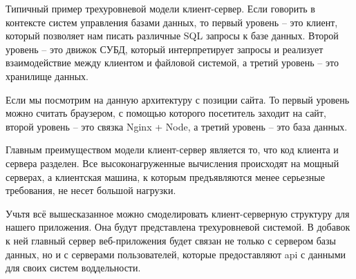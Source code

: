 Типичный пример трехуровневой модели клиент-сервер. Если говорить в контексте систем управления базами данных, то первый уровень – это клиент, который позволяет нам писать различные SQL запросы к базе данных. Второй уровень – это движок СУБД, который интерпретирует запросы и реализует взаимодействие между клиентом и файловой системой, а третий уровень – это хранилище данных.

Если мы посмотрим на данную архитектуру с позиции сайта. То первый уровень можно считать браузером, с помощью которого посетитель заходит на сайт, второй уровень – это связка Nginx + Node, а третий уровень – это база данных. 

Главным преимуществом модели клиент-сервер является то, что код клиента и сервера разделен. Все высоконагруженные вычисления происходят на мощный серверах, а клиентская машина, к которым предъявляются менее серьезные требования, не несет большой нагрузки.

Учьтя всё вышесказанное можно смоделировать клиент-серверную структуру для нашего приложения. Она будут представлена трехуровневой системой. В добавок к ней главный сервер веб-приложения будет связан не только с сервером базы данных, но и с серверами пользователей, которые предоставляют api с данными для своих систем воддельности. 
